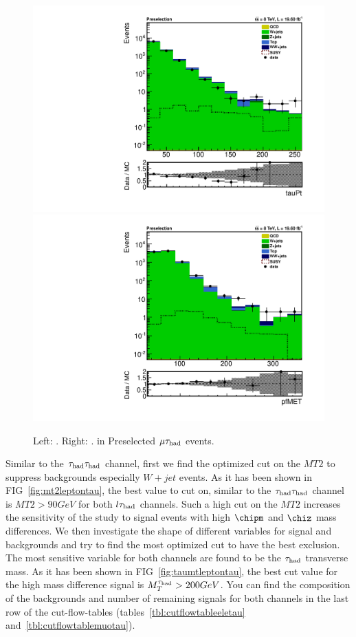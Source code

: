 \begin{figure}[htbp]
\centering
\includegraphics[angle=0,scale=0.35]{SelectionMuTau/tauPt_muTau.pdf}
\includegraphics[angle=0,scale=0.35]{SelectionMuTau/pfMET_muTau.pdf}
\caption{Left: \Tau\PT. Right: \MET. in Preselected $\mu\tau_{\rm had}$ events.}
\label{fig:datamcmuotau}
\end{figure}

Similar to the $\tau_{\rm had}\tau_{\rm had}$ channel, first we find the optimized cut on the $MT2$ to suppress backgrounds especially $W+jet$ events. As it has been shown in FIG~\ref{fig:mt2leptontau}, the best value to cut on, similar to the $\tau_{\rm had}\tau_{\rm had}$ channel is $MT2 > 90 GeV$ for both $l\tau_{\rm had}$ channels. Such a high cut on the $MT2$ increases the sensitivity of the study to signal events with high $\chipm$ and $\chiz$ mass differences. We then investigate the shape of different variables for signal and backgrounds and try to find the most optimized cut to have the best exclusion. The most sensitive variable for both channels are found to be the $\tau_{\rm had}$ transverse mass. As it has been shown in FIG~\ref{fig:taumtleptontau}, the best cut value for the high mass difference signal is $M_{T}^{\tau_{\rm had}} > 200 GeV$. You can find the composition of the backgrounds and number of remaining signals for both channels in the last row of the cut-flow-tables (tables~\ref{tbl:cutflowtableeletau} and~\ref{tbl:cutflowtablemuotau}).

